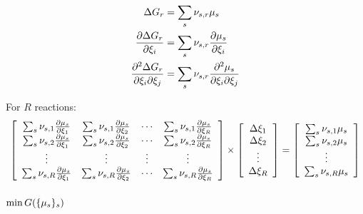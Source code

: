 \begin{equation}
\begin{split}
\DGibbs_r & = \sum_s \scoef[s,r] \chempot[s]\\
\doverdext[i]{\DGibbs_r}   & = \sum_s\scoef[s,r]\doverdext[i]{\chempot[s]} \\
\ddoverddext{\DGibbs_r}{i}{j} & = \sum_s\scoef[s,r]\ddoverddext{\chempot[s]}{i}{j} \\
\end{split}
\end{equation}

For $R$ reactions:
\begin{equation}
\left[\begin{array}{cccc}
\sum_s\scoef[s,1]\doverdext[1]{\chempot[s]} & \sum_s\scoef[s,1]\doverdext[2]{\chempot[s]} & \cdots & \sum_s\scoef[s,1]\doverdext[R]{\chempot[s]}\\
\sum_s\scoef[s,2]\doverdext[1]{\chempot[s]} & \sum_s\scoef[s,2]\doverdext[2]{\chempot[s]} & \cdots & \sum_s\scoef[s,2]\doverdext[R]{\chempot[s]}\\
\vdots &\vdots &\vdots &\vdots \\
\sum_s\scoef[s,R]\doverdext[1]{\chempot[s]} & \sum_s\scoef[s,R]\doverdext[2]{\chempot[s]} & \cdots & \sum_s\scoef[s,R]\doverdext[R]{\chempot[s]}\\
\end{array}\right]
\times
\left[\begin{array}{c}
\Delta\ext[1] \\
\Delta\ext[2] \\
\vdots \\ 
\Delta\ext[R]
\end{array}\right]
=
\left[\begin{array}{c}
\sum_s \scoef[s,1] \chempot[s] \\ 
\sum_s \scoef[s,2] \chempot[s] \\ 
\vdots \\ 
\sum_s \scoef[s,R] \chempot[s]
\end{array}\right]
\end{equation}

\subsubsection{\texorpdfstring{$\min\Gibbs(\{\chempot[s]\}_s)$}{Phase enthalpy minimization}}

